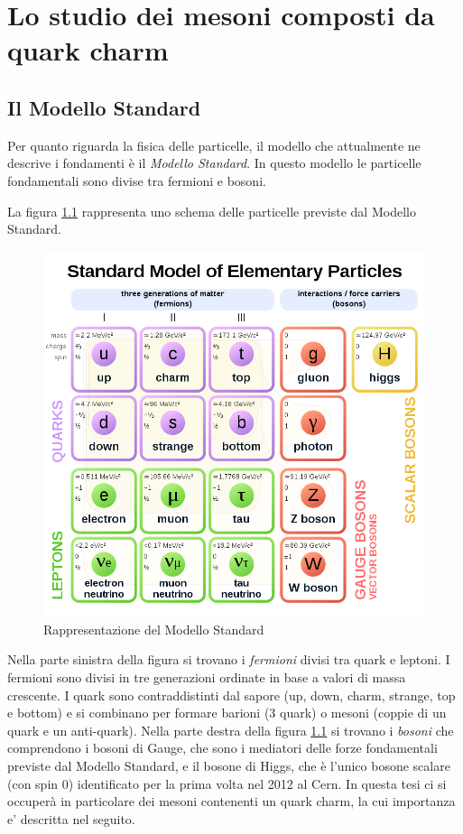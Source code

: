 \chapter{Lo studio dei mesoni composti da quark charm }

\section{Il Modello Standard}
Per quanto riguarda la fisica delle particelle, il modello che attualmente ne descrive i fondamenti è il \textit{Modello Standard}. In questo modello le particelle fondamentali sono divise tra fermioni e bosoni. 

La figura \ref{fig:ModelloStandard} rappresenta uno schema delle particelle previste dal Modello Standard.
    \begin{figure}[htbp]
        \centering
        \includegraphics[width=0.65\linewidth]{introParticelle/ModelloStandard.png}
        \caption{Rappresentazione del Modello Standard}
        \label{fig:ModelloStandard}
    \end{figure}
Nella parte sinistra della figura si trovano i \textit{fermioni} divisi tra quark e leptoni. I fermioni sono divisi in tre generazioni ordinate in base a valori di massa crescente. I quark sono contraddistinti dal sapore (up, down, charm, strange, top e bottom) e si combinano per formare barioni (3 quark) o mesoni (coppie di un quark e un anti-quark). Nella parte destra della figura \ref{fig:ModelloStandard} si trovano i \textit{bosoni} che comprendono i bosoni di Gauge, che sono i mediatori delle forze fondamentali previste dal Modello Standard, e il bosone di Higgs, che è l'unico bosone scalare (con spin 0) identificato per la prima volta nel 2012 al Cern. In questa tesi ci si occuper\`a in particolare dei mesoni contenenti un quark charm, la cui importanza e' descritta nel seguito.
 
